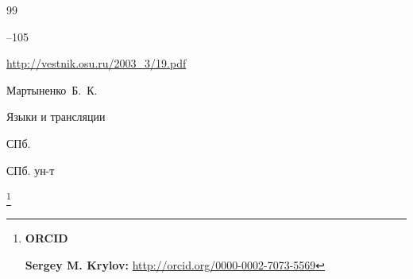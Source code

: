 \begin{thebibliography}{99}


--105

\elink \url{http://vestnik.osu.ru/2003_3/19.pdf}




\by Мартыненко~Б.~К.

\book Языки и трансляции

\publaddr СПб.

\publ СПб. ун-т







\end{thebibliography}



\RuDate



\pagebreak



\makeentitle





\thanks{{\bf ORCID}



{\bf Sergey M. Krylov:}     \url{http://orcid.org/0000-0002-7073-5569}





}



\EngRef




